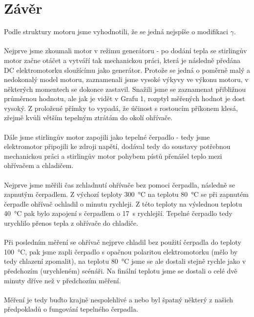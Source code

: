 \documentclass{protokol}
\begin{document}
\section{Závěr}
	Podle struktury motoru jsme vyhodnotili, že se jedná nejspíše o modifikaci \(\gamma\).  	
	\\
	\\
	Nejprve jsme zkoumali motor v režimu generátoru - po dodání tepla se stirlingův motor začne otáčet a vytváří tak mechanickou práci, která je následně předána DC elektromotorku sloužícímu jako generátor. Protože se jedná o poměrně malý a nedokonalý model motoru, zaznamenali jsme vysoké výkyvy ve výkonu motoru, v některých momentech se dokonce zastavil. Snažili jsme se zaznamenat přibližnou průměrnou hodnotu, ale jak je vidět v Grafu 1, rozptyl měřených hodnot je dost vysoký. Z proložené přímky to vypadá, že účinost s rostoucím příkonem klesá, zřejmě kvůli větším tepelným ztrátám do okolí ohřívače.
	\\ \\
	Dále jsme stirlingův motor zapojili jako tepelné čerpadlo - tedy jsme elektromotor připojili ke zdroji napětí, dodával tedy do soustavy potřebnou mechanickou práci a stirlingův motor pohybem pístů přenášel teplo mezi ohřívačem a chladičem. 
	\\ \\ 
	Nejprve jsme měřili čas zchladnutí ohřívače bez pomoci čerpadla, následně se zapnutým čerpadlem. Z výchozí teploty \SI{300}{\degreeCelsius} na teplotu \SI{80}{\degreeCelsius} se při zapnutém čerpadle ohřívač ochladil o minutu rychleji. Z této teploty na výslednou teplotu \SI{40}{\degreeCelsius} pak bylo zapojení s čerpadlem o \SI{17}{\second} rychlejší. Tepelné čerpadlo tedy urychlilo přenos tepla z ohřívače do chladiče.
	\\ \\
	Při posledním měření se ohřívač nejprve chladil bez použití čerpadla do teploty \SI{100}{\degreeCelsius}, pak jsme zapli čerpadlo s opačnou polaritou elektromotorku (mělo by tedy chlazení zpomalit), na teplotu \SI{80}{\degreeCelsius} jsme se ale dostali stejně rychle jako v předchozím (urychleném) scénáři. Na finální teplotu jsme se dostali o celé dvě minuty dříve než v předchozím měření. 
	\\ \\
	Měření je tedy buďto krajně nespolehlivé a nebo byl špatný některý z našich předpokladů o fungování tepelného čerpadla.
\end{document}
